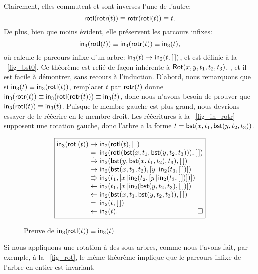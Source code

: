 Clairement, elles commutent et sont inverses l'une de l'autre:
\begin{equation*}
\abovedisplayskip=5pt
\belowdisplayskip=5pt
\fun{rotl}(\fun{rotr}(t)) \equiv \fun{rotr}(\fun{rotl}(t)) \equiv t.
\end{equation*}
De plus, bien que moins évident, elle préservent les parcours infixes:
\begin{equation*}
  \abovedisplayskip=5pt
  \belowdisplayskip=5pt
  \fun{in}_3(\fun{rotl}(t)) \equiv \fun{in}_3(\fun{rotr}(t)) \equiv
  \fun{in}_3(t),
\end{equation*}
où  calcule le parcours
infixe d'un arbre: \(\textsf{in}_3(t) \rightarrow \textsf{in}_2(t,[\,])\), et
 est définie à la
\fig~\vref{fig_bst0}. Ce théorème est relié de façon inhérente à
\(\textsf{Rot}({x,y,t_1,t_2,t_3})\),
, et il est facile à démontrer, sans recours à
l'induction. D'abord, nous remarquons que si \(\textsf{in}_3(t) \equiv
\textsf{in}_3(\textsf{rotl}(t))\), remplacer \(t\) par \(\textsf{rotr}(t)\)
donne \(\textsf{in}_3(\textsf{rotr}(t)) \equiv
\textsf{in}_3(\textsf{rotl}(\textsf{rotr}(t))) \equiv \textsf{in}_3(t)\), donc
nous n'avons besoin de prouver que \(\textsf{in}_3(\textsf{rotl}(t)) \equiv
\textsf{in}_3(t)\). Puisque le membre gauche est plus grand, nous
devrions essayer de le réécrire en le membre droit. Les réécritures à
la \fig~\vref{fig_in_rotr} supposent une rotation gauche, donc l'arbre
a la forme \(t=\textsf{bst}(x,t_1,\textsf{bst}(y,t_2,t_3))\).
\begin{figure}
  \begin{equation*}
    \boxed{
      \begin{array}{@{}r@{\;}l@{\;}l@{}}
  \fun{in}_3(\fun{rotl}(t))
  & \rightarrow & \fun{in}_2(\fun{rotl}(t),\el)\\
  & = & \fun{in}_2(\fun{rotl}(\fun{bst}(x,t_1,\fun{bst}(y,t_2,t_3))),\el)\\
  & \xrightarrow{\smash{\epsilon}} &
  \fun{in}_2(\fun{bst}(y,\fun{bst}(x,t_1,t_2),t_3),\el)\\
  & \rightarrow &
  \fun{in}_2(\fun{bst}(x,t_1,t_2),\cons{y}{\fun{in}_2(t_3,\el)})\\
  & \Rrightarrow &
 \fun{in}_2(t_1,\cons{x}{\fun{in}_2(t_2,\cons{y}{\fun{in}_2(t_3,\el)})})\\
  & \leftarrow &
  \fun{in}_2(t_1,\cons{x}{\fun{in}_2(\fun{bst}(y,t_2,t_3),\el)})\\
  & \leftarrow &
  \fun{in}_2(\fun{bst}(x,t_1,\fun{bst}(y,t_2,t_3)),\el)\\
  & = &
  \fun{in}_2(t,\el)\\
  & \leftarrow &
  \fun{in}_3(t).\hfill\Box
\end{array}
}
\end{equation*}
\caption{Preuve de \(\textsf{in}_3(\textsf{rotl}(t)) \equiv
  \textsf{in}_3(t)\)\label{fig_in_rotr}}
\end{figure}
Si nous appliquons une rotation à des sous-arbres, comme nous l'avons
fait, par exemple, à la \fig~\vref{fig_rot}, le même théorème implique
que le parcours infixe de l'arbre en entier est invariant.

